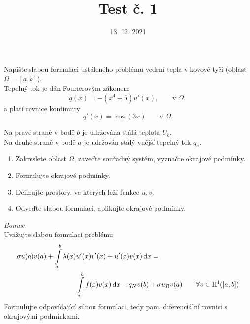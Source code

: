 \documentclass{article}
\def\d{{\rm{d}}}
\begin{document}
\title{Test č. 1}
\date{13. 12. 2021}
\author{}
\maketitle


\noindent

Napište slabou formulaci ustáleného problému vedení tepla v kovové tyči (oblast $\Omega=[a,b]$).\\
Tepelný tok je dán Fourierovým zákonem
\[
    q(x) = -(x^4+5)u'(x), \qquad \textrm{v }\Omega,
\]
a platí rovnice kontinuity
\[
    q'(x) = \cos(3x) \qquad \textrm{v }\Omega.
\]

\noindent
Na pravé straně v bodě $b$ je udržována stálá teplota $U_b$.\\
Na druhé straně v bodě $a$ je udržován stálý vnější tepelný tok $q_a$.

\begin{enumerate}
\item Zakreslete oblast $\Omega$, zaveďte souřadný systém, vyznačte okrajové podmínky.
\item Formulujte okrajové podmínky.
\item Definujte prostory, ve kterých leží funkce $u,v$.
\item Odvoďte slabou formulaci, aplikujte okrajové podmínky.
\end{enumerate}

\vspace{2cm}
\emph{Bonus:}\\
Uvažujte slabou formulaci problému
\begin{align*}
    \sigma u(a)v(a) + \int\limits_{a}^{b} \lambda(x) & u'(x)v'(x) + u'(x)v(x) \,\d x = \\
        &\int\limits_{a}^{b} f(x)v(x) \,\d x - q_Nv(b) + \sigma u_R v(a) \qquad \forall v\in \mathrm{H}^1([a,b])
\end{align*}
Formulujte odpovídající silnou formulaci, tedy parc. diferenciální rovnici s okrajovými podmínkami.
\end{document}
